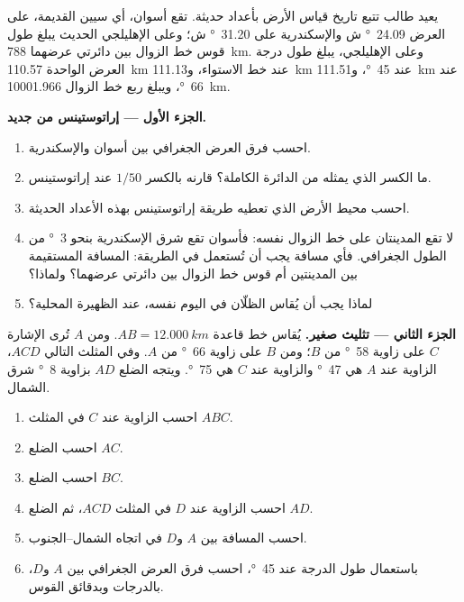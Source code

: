 \begin{problem}
\label{pb:g10:measuring-the-earth:1}
يعيد طالب تتبع تاريخ قياس الأرض بأعداد حديثة. تقع أسوان، أي سيين القديمة،
على العرض \qty{24.09}{\degree} ش والإسكندرية على \qty{31.20}{\degree} ش؛ وعلى
الإهليلجي الحديث يبلغ طول قوس خط الزوال بين دائرتي عرضهما
\qty{788}{km}. وعلى الإهليلجي، يبلغ طول درجة العرض الواحدة
\qty{110.57}{km} عند خط الاستواء، و\qty{111.13}{km} عند \qty{45}{\degree}،
و\qty{111.51}{km} عند \qty{66}{\degree}، ويبلغ ربع خط الزوال
\qty{10001.966}{km}.

\medskip
\noindent\textbf{الجزء الأول --- إراتوستينس من جديد.}
\begin{enumerate}
  \item احسب فرق العرض الجغرافي بين أسوان والإسكندرية.
  \item ما الكسر الذي يمثله من الدائرة الكاملة؟ قارنه بالكسر $1/50$ عند
        إراتوستينس.
  \item احسب محيط الأرض الذي تعطيه طريقة إراتوستينس بهذه الأعداد
        الحديثة.
  \item لا تقع المدينتان على خط الزوال نفسه: فأسوان تقع شرق الإسكندرية بنحو
        \qty{3}{\degree} من الطول الجغرافي. فأي مسافة يجب أن تُستعمل في
        الطريقة: المسافة المستقيمة بين المدينتين أم قوس خط الزوال بين دائرتي
        عرضهما؟ ولماذا؟
  \item لماذا يجب أن يُقاس الظلّان في اليوم نفسه، عند الظهيرة المحلية؟
\end{enumerate}

\medskip
\noindent\textbf{الجزء الثاني --- تثليث صغير.}
يُقاس خط قاعدة $AB = \qty{12.000}{km}$. ومن $A$ تُرى الإشارة $C$ على زاوية
\qty{58}{\degree} من $B$؛ ومن $B$ على زاوية \qty{66}{\degree} من $A$.
وفي المثلث التالي $ACD$، الزاوية عند $A$ هي \qty{47}{\degree} والزاوية عند
$C$ هي \qty{75}{\degree}. ويتجه الضلع $AD$ بزاوية \qty{8}{\degree}
شرق الشمال.
\begin{enumerate}[resume]
  \item احسب الزاوية عند $C$ في المثلث $ABC$.
  \item احسب الضلع $AC$.
  \item احسب الضلع $BC$.
  \item احسب الزاوية عند $D$ في المثلث $ACD$، ثم الضلع $AD$.
  \item احسب المسافة بين $A$ و$D$ في اتجاه الشمال--الجنوب.
  \item باستعمال طول الدرجة عند \qty{45}{\degree}، احسب فرق العرض الجغرافي
        بين $A$ و$D$، بالدرجات وبدقائق القوس.
\end{enumerate}


\end{problem}

